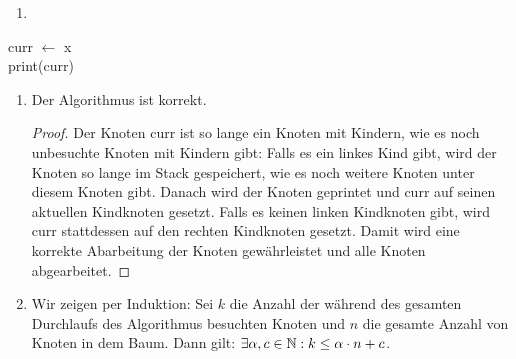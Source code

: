 \documentclass{scrartcl} %
\begin{document}
    \begin{aufgabe}
        \begin{enumerate}[label=(\alph*)]
            \item ~
        \end{enumerate}
            \begin{algorithm}[H]
                \caption{{\ttfamily Inorder-Tree-Walk(x)} (iterativ)}
                curr $\gets$ x\\
                print(curr)
            \end{algorithm}
        \begin{enumerate}[label=]
            \item 
            \begin{theorem*}
                Der Algorithmus ist korrekt.
            \end{theorem*}
            \begin{proof}
                Der Knoten {\ttfamily curr} ist so lange ein Knoten mit Kindern, wie es noch unbesuchte Knoten mit Kindern gibt: Falls es ein linkes Kind gibt, wird der Knoten so lange im Stack gespeichert, wie es noch weitere Knoten unter diesem Knoten gibt. Danach wird der Knoten geprintet und {\ttfamily curr} auf seinen aktuellen Kindknoten gesetzt. Falls es keinen linken Kindknoten gibt, wird {\ttfamily curr} stattdessen auf den rechten Kindknoten gesetzt. Damit wird eine korrekte Abarbeitung der Knoten gewährleistet und alle Knoten abgearbeitet.
            \end{proof}
        \end{enumerate}
        \begin{enumerate}[label=(\alph*)]
            \setcounter{enumi}{1}
            \item Wir zeigen per Induktion: Sei $k$ die Anzahl der während des gesamten Durchlaufs des Algorithmus besuchten Knoten und $n$ die gesamte Anzahl von Knoten in dem Baum. Dann gilt: $\exists \alpha, c\in \operatorname{\mathbb N}: k \leq \alpha \cdot n + c $.


\end{enumerate}
\end{aufgabe}
\end{document}
